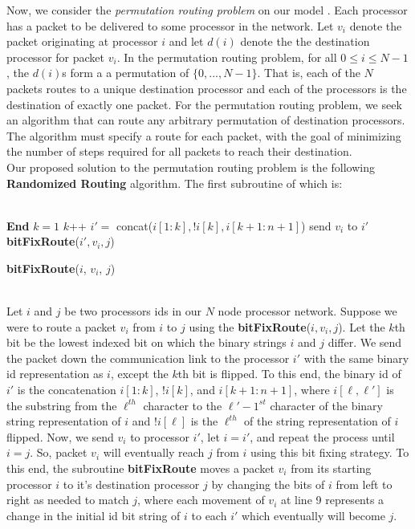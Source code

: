 \documentclass[psamsfonts, 10pt]{amsart}
\theoremstyle{definition}
\theoremstyle{remark}
\numberwithin{equation}{section}
\newcommand{\creturn}{\mbox{}\\}
\begin{document}
Now, we consider the {\it permutation routing problem} on our model \cite{randalg}. Each processor has a packet to be delivered to some processor in the network. Let $v_i$ denote the packet originating at processor $i$ and let $d(i)$ denote the the destination processor for packet $v_i$. In the permutation routing problem, for all $0 \leq i \leq N-1$, the $d(i)$s form a a permutation of $\{0, ... , N-1\}$. That is, each of the $N$ packets routes to a unique destination processor and each of the processors is the destination of exactly one packet. For the permutation routing problem, we seek an algorithm that can route any arbitrary permutation of destination processors. The algorithm must specify a route for each packet, with the goal of minimizing the number of steps required for all packets to reach their destination.\\

Our proposed solution to the permutation routing problem is the following {\bf Randomized Routing} algorithm. The first subroutine of which is:
\\ \\

\begin{algorithm}[H]
 {
	{\bf End}\;
}
$k = 1$\;
 {
	$k$++\;
}
$i' =$ concat($i[1:k], !i[k], i[k+1: n+1]$)\;
send $v_i$ to $i'$\;
{\bf bitFixRoute}($i', v_i, j$)\;
\caption{{\bf bitFixRoute}($i$, $v_i$, $j$)}
\end{algorithm}
\creturn

Let $i$ and $j$ be two processors ids in our $N$ node processor network. Suppose we were to route a packet $v_i$ from $i$ to $j$ using the {\bf bitFixRoute}($i, v_i, j$). Let the $k$th bit be the lowest indexed bit on which the binary strings $i$ and $j$ differ. We send the packet down the communication link to the processor $i'$ with the same binary id representation as $i$, except the $k$th bit is flipped. To this end, the binary id of $i'$ is the concatenation $i[1:k]$, $!i[k]$, and $i[k+1: n+1]$, where $i[\ell, \ell']$ is the substring from the $\ell^{th}$ character to the $\ell' -1^{st}$ character of the binary string representation of $i$ and $!i[\ell]$ is the $\ell^{th}$ of the string representation of $i$ flipped. Now, we send $v_i$ to processor $i'$, let $i = i'$, and repeat the process until $i = j$. So, packet $v_i$ will eventually reach $j$ from $i$ using this bit fixing strategy. To this end, the subroutine {\bf bitFixRoute} moves a packet $v_i$ from its starting processor $i$ to it's destination processor $j$ by changing the bits of $i$ from left to right as needed to match $j$, where each movement of $v_i$ at line 9 represents a change in the initial id bit string of $i$ to each $i'$ which eventually will become $j$.\\
\end{document}

